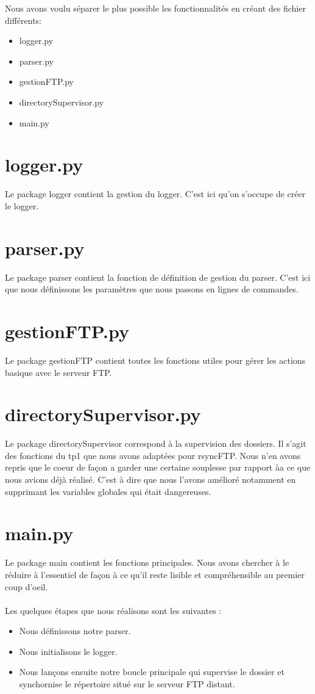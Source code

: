 Nous avons voulu séparer le plus possible les fonctionnalités en créant des fichier différents: 
\begin{itemize}
\item logger.py
\item parser.py
\item gestionFTP.py
\item directorySupervisor.py
\item main.py
\end{itemize}

\section{logger.py}	

Le package logger contient la gestion du logger. C'est ici qu'on s'occupe de créer le logger.

\section{parser.py}

Le package parser contient la fonction de définition de gestion du parser. 
C'est ici que nous définissons les paramètres que nous passons en lignes de commandes.

\section{gestionFTP.py}

Le package gestionFTP contient toutes les fonctions utiles pour gérer les actions basique avec le serveur FTP.

\section{directorySupervisor.py}

Le package directorySupervisor correspond à la supervision des dossiers. 
Il s'agit des fonctions du tp1 que nous avons adaptées pour rsyncFTP. 
Nous n'en avons repris que le coeur de façon a garder une certaine souplesse par rapport àa ce que nous avions déjà réalisé.
C'est à dire que nous l'avons amélioré notamment en supprimant les variables globales qui était dangereuses.

\section{main.py}

Le package main contient les fonctions principales. 
Nous avons chercher à le réduire à l'essentiel de façon à ce qu'il reste lisible et compréhensible au premier coup d'oeil.\\
\\
Les quelques étapes que nous réalisons sont les suivantes :
\begin{itemize}
\item Nous définissons notre parser.
\item Nous initialisons le logger.
\item Nous lançons ensuite notre boucle principale qui supervise le dossier et synchornise le répertoire situé sur le serveur FTP distant.
\end{itemize}
